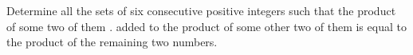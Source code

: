 Determine all the sets of six consecutive positive integers such that the product of some two  of  them . added to the product of some other two  of  them is equal to the product of the remaining two numbers.